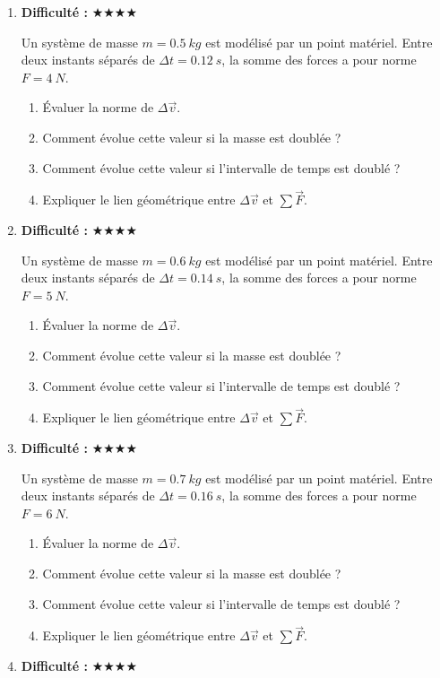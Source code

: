 \documentclass[11pt,a4paper]{article}
\newcommand{\etoiles}[1]{\textbf{Difficulté : }#1}
\begin{document}
\begin{enumerate}[label=\textbf{Exercice \arabic*.},leftmargin=*]
On considère un liquide de masse volumique $\rho=1100\ \si{kg.m^{-3}}$.
Deux points $A$ et $B$ sont séparés verticalement de $h=0.6\ \si{m}$, le point $B$ étant plus bas.
\begin{enumerate}[label=\alph*)]
\item Écrire la loi fondamentale de la statique des fluides.
\item Calculer la différence de pression $P_B-P_A$.
\item Interpréter physiquement le signe obtenu.
\item Déterminer la force pressante sur une surface $S=18\ \si{cm^2}$ placée au point $B$.
\end{enumerate}
\item \etoiles{★★★★}

Un système de masse $m=0.5\ \si{kg}$ est modélisé par un point matériel.
Entre deux instants séparés de $\Delta t=0.12\ \si{s}$, la somme des forces a pour norme $F=4\ \si{N}$.
\begin{enumerate}[label=\alph*)]
\item Évaluer la norme de $\Delta \vec v$.
\item Comment évolue cette valeur si la masse est doublée ?
\item Comment évolue cette valeur si l'intervalle de temps est doublé ?
\item Expliquer le lien géométrique entre $\Delta\vec v$ et $\sum \vec F$.
\end{enumerate}
\item \etoiles{★★★★}

Un système de masse $m=0.6\ \si{kg}$ est modélisé par un point matériel.
Entre deux instants séparés de $\Delta t=0.14\ \si{s}$, la somme des forces a pour norme $F=5\ \si{N}$.
\begin{enumerate}[label=\alph*)]
\item Évaluer la norme de $\Delta \vec v$.
\item Comment évolue cette valeur si la masse est doublée ?
\item Comment évolue cette valeur si l'intervalle de temps est doublé ?
\item Expliquer le lien géométrique entre $\Delta\vec v$ et $\sum \vec F$.
\end{enumerate}
\item \etoiles{★★★★}

Un système de masse $m=0.7\ \si{kg}$ est modélisé par un point matériel.
Entre deux instants séparés de $\Delta t=0.16\ \si{s}$, la somme des forces a pour norme $F=6\ \si{N}$.
\begin{enumerate}[label=\alph*)]
\item Évaluer la norme de $\Delta \vec v$.
\item Comment évolue cette valeur si la masse est doublée ?
\item Comment évolue cette valeur si l'intervalle de temps est doublé ?
\item Expliquer le lien géométrique entre $\Delta\vec v$ et $\sum \vec F$.
\end{enumerate}
\item \etoiles{★★★★}


\end{enumerate}
\end{document}
